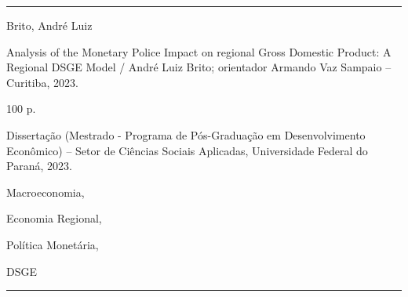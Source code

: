 \documentclass[../thesis.tex]{subfiles}
\begin{document}
	\newpage
	
	\null
	\vfill
	\hrule
	\vspace*{-0.3cm}
	
	{\singlespacing
		
	Brito, André Luiz

	\hspace{0.5cm} Analysis of the Monetary Police Impact on regional Gross Domestic Product: A Regional DSGE Model / André Luiz Brito; orientador Armando Vaz Sampaio -- Curitiba, 2023.
	
	\hspace{0.5cm} 100 p.
	
	\hspace{0.5cm} Dissertação (Mestrado - Programa de Pós-Graduação em Desenvolvimento Econômico) -- Setor de Ciências Sociais Aplicadas, Universidade Federal do Paraná, 2023.
	
	\hspace{0.5cm} 
	\begin{enumerate*}[label=\arabic*.]
		\item Macroeconomia, 
		\item Economia Regional, 
		\item Política Monetária,
		\item DSGE
	\end{enumerate*}		
	
	}	
		
	\vspace*{0.5cm}
	
	\hrule
	
	\vspace*{1cm}
	
	\thispagestyle{empty}
	
\end{document}
